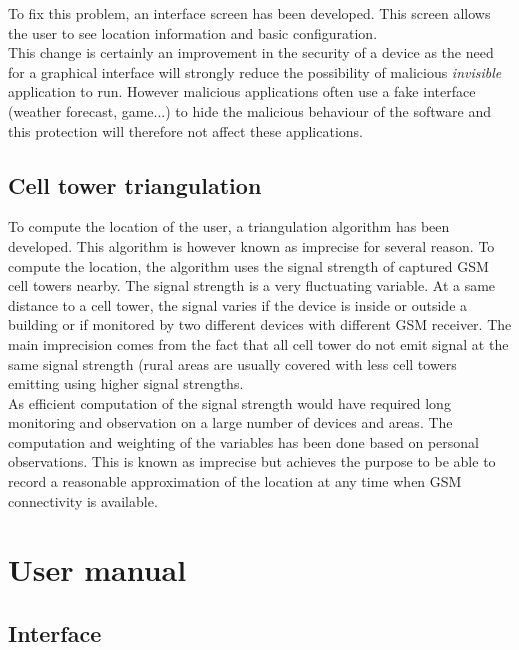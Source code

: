To fix this problem, an interface screen has been developed.
This screen allows the user to see location information and basic configuration.\\

This change is certainly an improvement in the security of a device as the need for a graphical interface will strongly reduce the possibility of malicious \emph{invisible} application to run.
However malicious applications often use a fake interface (weather forecast, game...) to hide the malicious behaviour of the software and this protection will therefore not affect these applications.

\subsection{Cell tower triangulation}
\label{sec:dw-difficult-cell}

To compute the location of the user, a triangulation algorithm has been developed.
This algorithm is however known as imprecise for several reason.
To compute the location, the algorithm uses the signal strength of captured GSM cell towers nearby.
The signal strength is a very fluctuating variable.
At a same distance to a cell tower, the signal varies if the device is inside or outside a building or if monitored by two different devices with different GSM receiver.
The main imprecision comes from the fact that all cell tower do not emit signal at the same signal strength (rural areas are usually covered with less cell towers emitting using higher signal strengths.\\

As efficient computation of the signal strength would have required long monitoring and observation on a large number of devices and areas.
The computation and weighting of the variables has been done based on personal observations.
This is known as imprecise but achieves the purpose to be able to record a reasonable approximation of the location at any time when GSM connectivity is available.\\

\section{User manual}

\subsection{Interface}
\label{sec:dw-gui}

